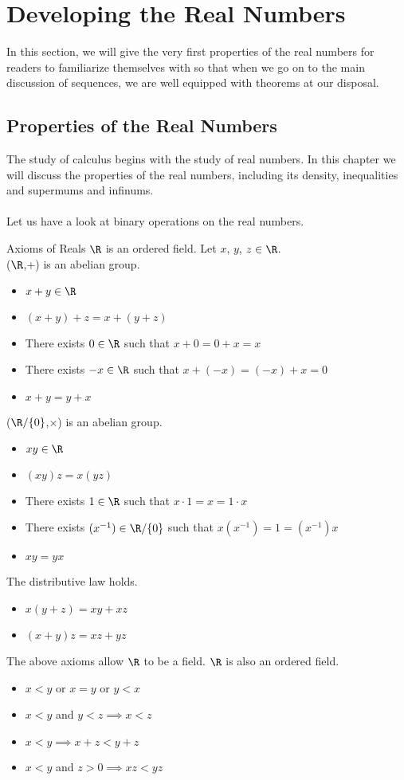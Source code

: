 \section{Developing the Real Numbers}
In this section, we will give the very first properties of the real numbers for readers to familiarize themselves with so that when we go on to the main discussion of sequences, we are well equipped with theorems at our disposal. 

\subsection{Properties of the Real Numbers}
The study of calculus begins with the study of real numbers. In this chapter we will discuss the properties of the real numbers, including its density, inequalities and supermums and infinums. \\~\\
Let us have a look at binary operations on the real numbers. 

\begin{defn}{Axioms of Reals}{} $\R$ is an ordered field. Let $x$, $y$, $z\in\R$. \\
($\R$,+) is an abelian group. 
\begin{itemize}
\item $x+y\in\R$
\item $(x+y)+z=x+(y+z)$
\item There exists $0\in\R$ such that $x+0=0+x=x$
\item There exists $-x\in\R$ such that $x+(-x)=(-x)+x=0$
\item $x+y=y+x$
\end{itemize}
($\R/\{0\}$,$\times$) is an abelian group. 
\begin{itemize}
\item $xy\in\R$
\item $(xy)z=x(yz)$
\item There exists $1\in\R$ such that $x\cdot1=x=1\cdot x$
\item There exists $(x^{-1})\in\R/\{0\}$ such that $x(x^{-1})=1=(x^{-1})x$
\item $xy=yx$
\end{itemize}
The distributive law holds. 
\begin{itemize}
\item $x(y+z)=xy+xz$
\item $(x+y)z=xz+yz$
\end{itemize}
The above axioms allow $\R$ to be a field. $\R$ is also an ordered field. 
\begin{itemize}
\item $x<y$ or $x=y$ or $y<x$
\item $x<y$ and $y<z\implies x<z$
\item $x<y\implies x+z<y+z$
\item $x<y$ and $z>0\implies xz<yz$
\end{itemize}
\end{defn}

